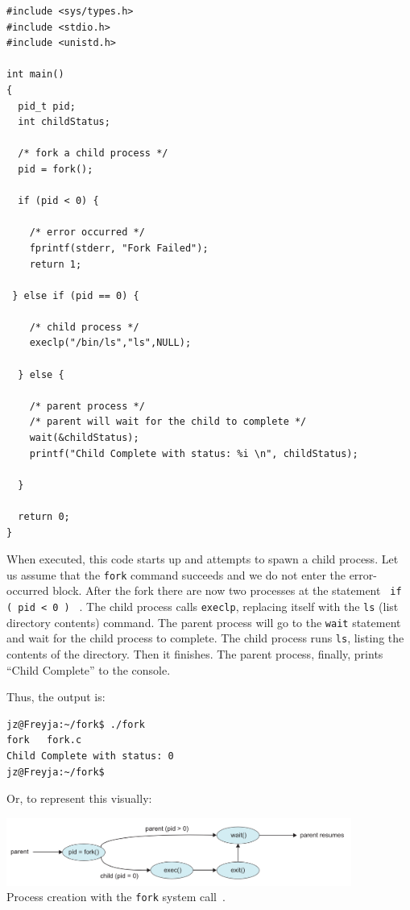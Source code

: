 \begin{verbatim}
#include <sys/types.h>
#include <stdio.h> 
#include <unistd.h>

int main()
{
  pid_t pid;
  int childStatus;

  /* fork a child process */
  pid = fork();
  
  if (pid < 0) { 
  
    /* error occurred */ 
    fprintf(stderr, "Fork Failed"); 
    return 1;
    
 } else if (pid == 0) { 
    
    /* child process */
    execlp("/bin/ls","ls",NULL);
    
  } else { 
    
    /* parent process */
    /* parent will wait for the child to complete */
    wait(&childStatus);
    printf("Child Complete with status: %i \n", childStatus);
    
  }
    
  return 0;
}
\end{verbatim}

When executed, this code starts up and attempts to spawn a child process. Let us assume that the \texttt{fork} command succeeds and we do not enter the error-occurred block.  After the fork there are now two processes at the statement \texttt{ if ( pid < 0 ) } . The child process calls \texttt{execlp}, replacing itself with the \texttt{ls} (list directory contents) command. The parent process will go to the \texttt{wait} statement and wait for the child process to complete. The child process runs \texttt{ls}, listing the contents of the directory. Then it finishes. The parent process, finally, prints ``Child Complete'' to the console.

Thus, the output is:
\begin{verbatim}
jz@Freyja:~/fork$ ./fork 
fork   fork.c
Child Complete with status: 0
jz@Freyja:~/fork$ 
\end{verbatim}

Or, to represent this visually:

\begin{center}
\includegraphics[width=0.85\textwidth]{images/fork-syscall.png}\\
Process creation with the \texttt{fork} system call~\cite{osc}.
\end{center}


